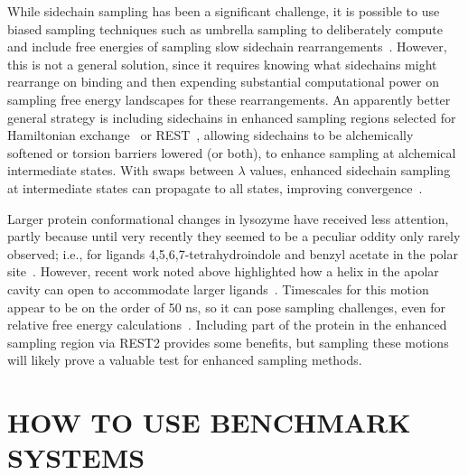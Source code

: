 \documentclass[aps,pre,twocolumn,nofootinbib,superscriptaddress,10pt, final,tightenlines]{revtex4-1}
\begin{document}
While sidechain sampling has been a significant challenge, it is possible to use biased sampling techniques such as umbrella sampling to deliberately compute and include free energies of sampling slow sidechain rearrangements~\cite{mobley_confine_2007}. 
However, this is not a general solution, since it requires knowing what sidechains might rearrange on binding and then expending substantial computational power on sampling free energy landscapes for these rearrangements. 
An apparently better general strategy is including sidechains in enhanced sampling regions selected for Hamiltonian exchange~\cite{jiang_free_2010, khavrutskii_improved_2011} or REST~\cite{wang_achieving_2012}, allowing sidechains to be alchemically softened or torsion barriers lowered (or both), to enhance sampling at alchemical intermediate states.
With swaps between $\lambda$ values, enhanced sidechain sampling at intermediate states can propagate to all states, improving convergence~\cite{jiang_free_2010, wang_achieving_2012}.

Larger protein conformational changes in lysozyme have received less attention, partly because until very recently they seemed to be a peculiar oddity only rarely observed; i.e., for ligands 4,5,6,7-tetrahydroindole and benzyl acetate in the polar site~\cite{boyce_predicting_2009}. 
However, recent work noted above highlighted how a helix in the apolar cavity can open to accommodate larger ligands~\cite{merski_homologous_2015}. 
Timescales for this motion appear to be on the order of 50 ns, so it can pose sampling challenges, even for relative free energy calculations~\cite{lim_sensitivity_2016}. 
Including part of the protein in the enhanced sampling region via REST2 provides some benefits, but sampling these motions will likely prove a valuable test for enhanced sampling methods.


\section{HOW TO USE BENCHMARK SYSTEMS}
\end{document}
